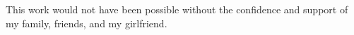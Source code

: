 \begin{titlepage}
\end{titlepage}




\begin{romanpages}

\begin{copyrightpage}
\end{copyrightpage}

\begin{approvalpage}
\end{approvalpage}


\begin{acknowledgementpage}
This work would not have been possible without the confidence and support of my family, friends, and my girlfriend. \\
\end{acknowledgementpage}


\begin{contentpage}
  \begin{flushleft}
  \end{flushleft}
  \tableofcontents
  \begin{flushleft}
  \end{flushleft}
\end{contentpage}



\end{romanpages}
